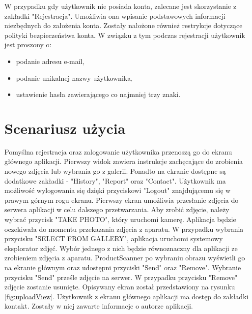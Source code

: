 {W przypadku gdy użytkownik nie posiada konta, zalecane jest skorzystanie z zakładki "Rejestracja". Umożliwia ona wpisanie podstawowych informacji niezbędnych do założenia konta. Zostały nałożone również restrykcje dotyczące polityki bezpieczeństwa konta. W związku z tym podczas rejestracji użytkownik jest proszony o:
\begin{itemize}[noitemsep]
	\item podanie adresu e-mail,
	\item podanie unikalnej nazwy użytkownika,
	\item ustawienie hasła zawierającego co najmniej trzy znaki.
\end{itemize} 
}
\newpage
\section{Scenariusz użycia}{

Pomyślna rejestracja oraz zalogowanie użytkownika przenoszą go do ekranu głównego aplikacji. Pierwszy widok zawiera instrukcje zachęcające do zrobienia nowego zdjęcia lub wybrania go z galerii. Ponadto na ekranie dostępne są dodatkowe zakładki - "History", "Report" oraz "Contact". Użytkownik ma możliwość wylogowania się dzięki przyciskowi "Logout" znajdującemu się w prawym górnym rogu ekranu. Pierwszy ekran umożliwia przesłanie zdjęcia do serwera aplikacji w celu dalszego przetwarzania. Aby zrobić zdjęcie, należy wybrać przycisk "TAKE PHOTO", który uruchomi kamerę. Aplikacja będzie oczekiwała do momentu przekazania zdjęcia z aparatu. W przypadku wybrania przycisku "SELECT FROM GALLERY", aplikacja uruchomi systemowy eksplorator zdjęć. Wybór jednego z nich będzie równoznaczny dla aplikacji ze zrobieniem zdjęcia z aparatu. ProductScanner po wybraniu obrazu wyświetli go na ekranie głównym oraz udostępni przyciski "Send" oraz "Remove". Wybranie przycisku "Send" prześle zdjęcie na serwer. W przypadku przycisku "Remove" zdjęcie zostanie usunięte. Opisywany ekran został przedstawiony na rysunku \ref{fig:uploadView}. Użytkownik z ekranu głównego aplikacji ma dostęp do zakładki kontakt. Zostały w niej zawarte informacje o autorze aplikacji.

}
